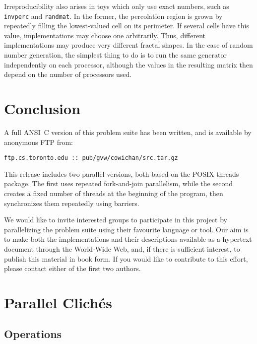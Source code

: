 Irreproducibility also arises in toys which only use exact numbers, such as {\tt{invperc}} and {\tt{randmat}}.
In the former, the percolation region is grown by repeatedly filling the lowest-valued cell on its perimeter.
If several cells have this value, implementations may choose one arbitrarily.
Thus, different implementations may produce very different fractal shapes.
In the case of random number generation, the simplest thing to do is to run the same generator independently on each processor,
although the values in the resulting matrix then depend on the number of processors used.

\section{Conclusion\label{s:conclude}}

A full ANSI~C version of this problem suite has been written, and is available by anonymous FTP from:
\begin{center}
{\tt{ftp.cs.toronto.edu :: pub/gvw/cowichan/src.tar.gz}}
\end{center}
This release includes two parallel versions,
both based on the POSIX threads package.
The first uses repeated fork-and-join parallelism,
while the second creates a fixed number of threads at the beginning of the program,
then synchronizes them repeatedly using barriers.

We would like to invite interested groups to participate in this project by parallelizing the problem suite using their favourite language or tool.
Our aim is to make both the implementations and their descriptions available as a hypertext document through the World-Wide Web,
and, if there is sufficient interest, to publish this material in book form.
If you would like to contribute to this effort, please contact either of the first two authors.


\newcommand{\bibea}{{\em{et~al.}}}


\appendix

\newpage
\section{Parallel Clich\'{e}s\label{s:cliche}}

\subsection{Operations\label{s:cliche-ops}}

